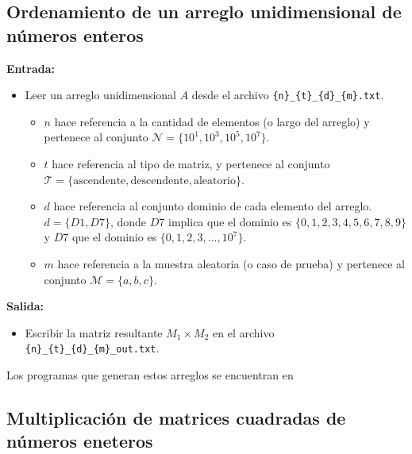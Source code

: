 \subsection{Ordenamiento de un arreglo unidimensional de números enteros}

\textbf{Entrada:}
\begin{itemize}
    \item Leer un arreglo unidimensional $A$ desde el archivo \texttt{\{n\}\_\{t\}\_\{d\}\_\{m\}.txt}.
    \begin{itemize}
        \item $n$ hace referencia a la cantidad de elementos (o largo del arreglo) y pertenece al conjunto $\mathcal{N} = \{10^1, 10^3, 10^5, 10^{7}\}$.
        \item $t$ hace referencia al tipo de matriz, y pertenece al conjunto $\mathcal{T} = \{ \text{ascendente}, \text{descendente}, \text{aleatorio} \}$.
        \item $d$ hace referencia al conjunto dominio de cada elemento del arreglo. $d = \{D1, D7\}$, donde $D7$ implica que el dominio es $\{0,1,2,3,4,5,6,7,8,9\}$ y $D7 $ que el dominio es $ \{0,1,2,3,...,10^7\}$.
        \item $m$ hace referencia a la muestra aleatoria (o caso de prueba) y pertenece al conjunto $\mathcal{M} = \{a,b,c\}$.
    \end{itemize}
\end{itemize}

\textbf{Salida:}
\begin{itemize}
    \item Escribir la matriz resultante $M_1 \times M_2$ en el archivo \texttt{\{n\}\_\{t\}\_\{d\}\_\{m\}\_out.txt}.
\end{itemize}

\begin{mdframed}
    Los programas que generan estos arreglos se encuentran en 

    \begin{center}
    \end{center}
    
    
\end{mdframed}

\subsection{Multiplicación de matrices cuadradas de números eneteros}

